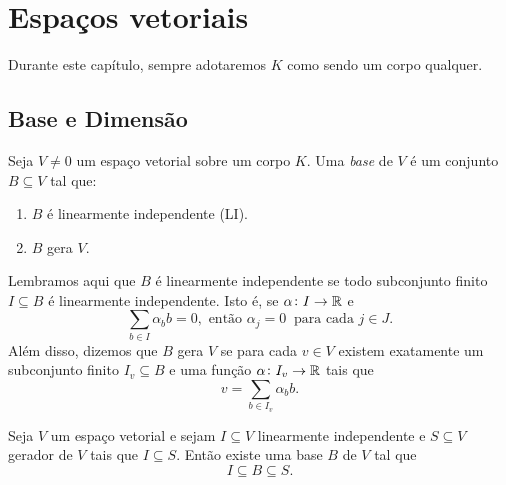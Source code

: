 \documentclass[11pt,twoside,a4paper]{book}
\begin{document}
\chapter{Espaços vetoriais}

Durante este capítulo, sempre adotaremos $K$ como sendo um corpo qualquer.

\section{Base e Dimensão}

\begin{definicao}
Seja $V \neq 0$ um espaço vetorial sobre um corpo $K$. Uma \emph{base} de \(V\) é um conjunto $B\subseteq V$ tal que:
\begin{enumerate}[label=(\roman*)]
\item $B$ é linearmente independente (LI).
\item $B$ gera $V$.
\end{enumerate}
\end{definicao}
Lembramos aqui que $B$ é linearmente independente se todo subconjunto finito
$I\subseteq B$ é linearmente independente. Isto é, se \(\alpha\colon I\to\mathbb{R}\) e
\[
\sum_{b\in I} \alpha_bb = 0,
 \text{ então } \alpha_j = 0 \ \text{ para cada 
} j \in J.\] 
Além disso, dizemos que \(B\) gera \(V\) se para cada \(v\in V\) existem exatamente
um subconjunto finito \(I_v\subseteq B\) e uma função \(\alpha\colon
I_v\to\mathbb{R}\) tais que \[v=\sum_{b\in I_v}\alpha_bb.\]  
\begin{teorema}
Seja $V$ um espaço vetorial e sejam $I\subseteq V$ linearmente independente e $S\subseteq V$ gerador de $V$ tais que $I\subseteq S$. Então existe uma base $B$ de $V$ tal que \[I\subseteq B\subseteq S.\]
\end{teorema}
\end{document}
